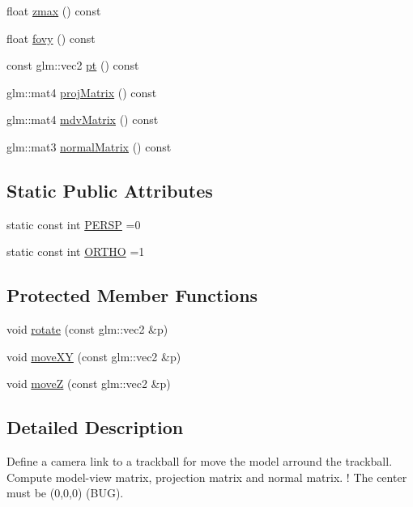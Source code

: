 \begin{DoxyCompactItemize}
float \mbox{\hyperlink{class_camera_a9f4ee36190bc2ef829efe11a8947dd5e}{zmax}} () const
\item 
float \mbox{\hyperlink{class_camera_ab437eb669d4bff47c4496933d06c5f9d}{fovy}} () const
\item 
const glm\+::vec2 \mbox{\hyperlink{class_camera_ae8cd001188c4b4381cd78a30f2669151}{pt}} () const
\item 
glm\+::mat4 \mbox{\hyperlink{class_camera_a30d3392172776022c53909e8b846995a}{proj\+Matrix}} () const
\item 
glm\+::mat4 \mbox{\hyperlink{class_camera_ac6671aeaa88d6cc673864f0183d5046b}{mdv\+Matrix}} () const
\item 
glm\+::mat3 \mbox{\hyperlink{class_camera_a2032bd7b990ca809759feabf2e54c612}{normal\+Matrix}} () const
\end{DoxyCompactItemize}
\subsection*{Static Public Attributes}
\begin{DoxyCompactItemize}
\item 
static const int \mbox{\hyperlink{class_camera_a522ee90309c2918e4b9695fcdccd061c}{P\+E\+R\+SP}} =0
\item 
static const int \mbox{\hyperlink{class_camera_a7244b2a4baebe084d16492758d16451c}{O\+R\+T\+HO}} =1
\end{DoxyCompactItemize}
\subsection*{Protected Member Functions}
\begin{DoxyCompactItemize}
\item 
void \mbox{\hyperlink{class_camera_a46f849a8ee9514d0e35269f5fce48096}{rotate}} (const glm\+::vec2 \&p)
\item 
void \mbox{\hyperlink{class_camera_a53a4ce8177d8622bcc01ae9a8f8fe391}{move\+XY}} (const glm\+::vec2 \&p)
\item 
void \mbox{\hyperlink{class_camera_a7c6676296255f1aef549228bf1c0a715}{moveZ}} (const glm\+::vec2 \&p)
\end{DoxyCompactItemize}


\subsection{Detailed Description}
Define a camera link to a trackball for move the model arround the trackball. Compute model-\/view matrix, projection matrix and normal matrix. ! The center must be (0,0,0) (B\+UG). 

